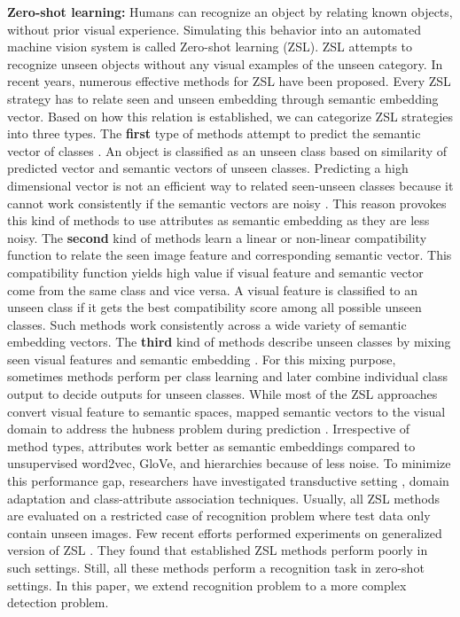 \documentclass[runningheads]{llncs}
\begin{document}
\textbf{Zero-shot learning:} Humans can recognize an object by relating known objects, without prior visual experience. Simulating this behavior into an automated machine vision system is called Zero-shot learning (ZSL). ZSL attempts to recognize unseen objects without any visual examples of the unseen category. In recent years, numerous effective methods for ZSL have been proposed. Every ZSL strategy has to relate seen and unseen embedding through semantic embedding vector. Based on how this relation is established, we can categorize ZSL strategies into three types. The \textbf{first} type of methods attempt to predict the semantic vector of classes \cite{Hinton_NIPS_2009,Wang_CVPR_2013,Lampert_PAMI_2014,Yu_CVPR_2013}. An object is classified as an unseen class based on similarity of predicted vector and semantic vectors of unseen classes. Predicting a high dimensional vector is not an efficient way to related seen-unseen classes because it cannot work consistently if the semantic vectors are noisy \cite{Jayaraman_NIPS_2014}. This reason provokes this kind of methods to use attributes as semantic embedding as they are less noisy. The \textbf{second} kind of methods learn a linear \cite{Akata_PAMI_2016,Akata_CVPR_2015,romera_ICML_2015} or non-linear \cite{Xian_2016_CVPR,Socher_NIPS_2013} compatibility function to relate the seen image feature and corresponding semantic vector. This compatibility function yields high value if visual feature and semantic vector come from the same class and vice versa. A visual feature is classified to an unseen class if it gets the best compatibility score among all possible unseen classes. Such methods work consistently across a wide variety of semantic embedding vectors. The \textbf{third} kind of methods describe unseen classes by mixing seen visual features and semantic embedding \cite{norouzi_arXiv_2013,Changpinyo_2016_CVPR,Zhang_2015_ICCV}. For this mixing purpose, sometimes methods perform per class learning and later combine individual class output to decide outputs for unseen classes. While most of the ZSL approaches convert visual feature to semantic spaces, \cite{Kodirov_2017_CVPR,Zhang_2017_CVPR} mapped semantic vectors to the visual domain to address the hubness problem during prediction \cite{Shigeto_Hubness_2015}. Irrespective of method types, attributes work better as semantic embeddings compared to unsupervised word2vec, GloVe, and hierarchies because of less noise. To minimize this performance gap, researchers have investigated transductive setting \cite{Ye_DSRL2017_CVPR,Xu_Matrix_CVPR_2017,Li_2017_CVPR}, domain adaptation \cite{Deutsch_2017_CVPR,Kodirov_2015_ICCV} and class-attribute association \cite{Al-Halah_2016_CVPR,Demirel_2017_ICCV} techniques. Usually, all ZSL methods are evaluated on a restricted case of recognition problem where test data only contain unseen images. Few recent efforts performed experiments on generalized version of ZSL \cite{Xu_Matrix_CVPR_2017,Xian_CVPR_2017,Li_2017_CVPR}. They found that established ZSL methods perform poorly in such settings. Still, all these methods perform a recognition task in zero-shot settings. In this paper, we extend recognition problem to a more complex detection problem.
\end{document}
